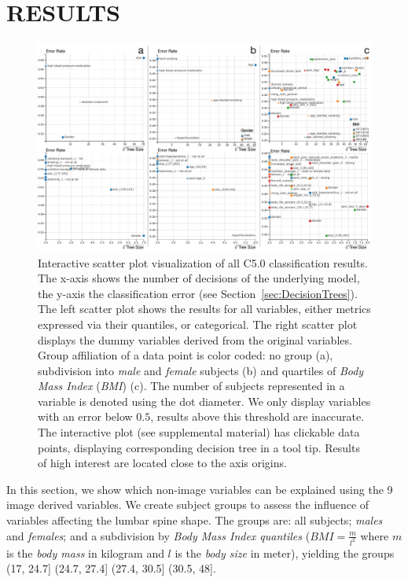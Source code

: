 \documentclass[a4paper,twoside]{style/article}
\begin{document}
\section{\uppercase{Results}}
\begin{figure}[!t]
  \centering
  \includegraphics[width=1\textwidth]{figures/results}
  \caption{
Interactive scatter plot visualization of all C5.0 classification results.
The x-axis shows the number of decisions of the underlying model, the y-axis the classification error (see Section~\ref{sec:DecisionTrees}).
The left scatter plot shows the results for all variables, either metrics expressed via their quantiles, or categorical.
The right scatter plot displays the dummy variables derived from the original variables.
Group affiliation of a data point is color coded:
no group (a), subdivision into \emph{male} and \emph{female} subjects (b) and quartiles of \emph{Body Mass Index} (\emph{BMI}) (c). %
The number of subjects represented in a variable is denoted using the dot diameter.
We only display variables with an error below $0.5$, results above this threshold are inaccurate.
The interactive plot (see supplemental material) has clickable data points, displaying corresponding decision tree in a tool tip.
Results of high interest are located close to the axis origins.
}
  \label{fig:results}
\end{figure}
\noindent In this section, we show which non-image variables can be explained using the 9 image derived variables.
We create subject groups to assess the influence of variables affecting the lumbar spine shape.
The groups are: all subjects; \emph{males} and \emph{females}; and a subdivision by \emph{Body Mass Index quantiles} ($BMI = \frac{m}{l^2}$ where $m$ is the \emph{body mass} in kilogram and $l$ is the \emph{body size} in meter), yielding the groups (17, 24.7] (24.7, 27.4] (27.4, 30.5] (30.5, 48].
\end{document}
